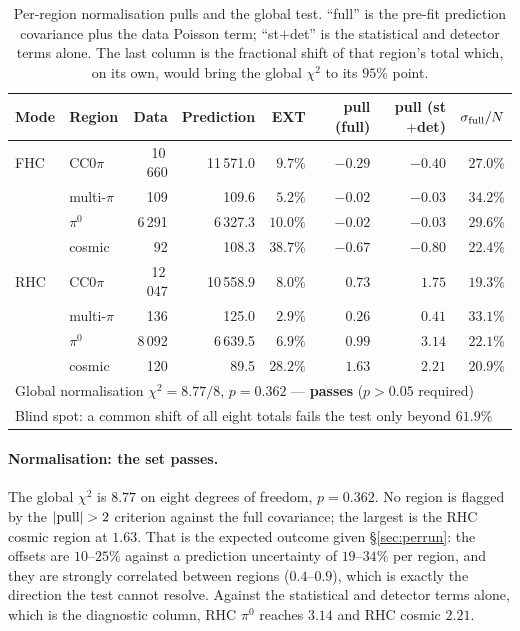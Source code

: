 \documentclass[11pt,a4paper]{article}
\begin{document}
\begin{table}[H]
  \centering
  \caption{Per-region normalisation pulls and the global test. ``full'' is the pre-fit
    prediction covariance plus the data Poisson term; ``st$+$det'' is the statistical and
    detector terms alone. The last column is the fractional shift of that region's total
    which, on its own, would bring the global $\chi^2$ to its $95\%$ point.}
  \label{tab:pulls}
  \small
  \begin{tabular}{llrrrrrr}
    \toprule
    Mode & Region & Data & Prediction & EXT & pull (full) & pull (st$+$det) & $\sigma_{\rm full}/N$ \\
    \midrule
    FHC & CC$0\pi$    & 10\,660 & 11\,571.0 & $9.7\%$  & $-0.29$ & $-0.40$ & $27.0\%$ \\
        & multi-$\pi$ &     109 &     109.6 & $5.2\%$  & $-0.02$ & $-0.03$ & $34.2\%$ \\
        & $\pi^0$     &  6\,291 &  6\,327.3 & $10.0\%$ & $-0.02$ & $-0.03$ & $29.6\%$ \\
        & cosmic      &      92 &     108.3 & $38.7\%$ & $-0.67$ & $-0.80$ & $22.4\%$ \\
    \midrule
    RHC & CC$0\pi$    & 12\,047 & 10\,558.9 & $8.0\%$  & $ 0.73$ & $ 1.75$ & $19.3\%$ \\
        & multi-$\pi$ &     136 &     125.0 & $2.9\%$  & $ 0.26$ & $ 0.41$ & $33.1\%$ \\
        & $\pi^0$     &  8\,092 &  6\,639.5 & $6.9\%$  & $ 0.99$ & $ 3.14$ & $22.1\%$ \\
        & cosmic      &     120 &      89.5 & $28.2\%$ & $ 1.63$ & $ 2.21$ & $20.9\%$ \\
    \midrule
    \multicolumn{8}{l}{Global normalisation $\chi^2 = 8.77/8$, $p=0.362$ --- \textbf{passes} ($p>0.05$ required)} \\
    \multicolumn{8}{l}{Blind spot: a common shift of all eight totals fails the test only beyond $61.9\%$} \\
    \bottomrule
  \end{tabular}
\end{table}

\paragraph{Normalisation: the set passes.} The global $\chi^2$ is $8.77$ on eight degrees
of freedom, $p=0.362$. No region is flagged by the $|{\rm pull}|>2$ criterion against the
full covariance; the largest is the RHC cosmic region at $1.63$. That is the expected
outcome given \S\ref{sec:perrun}: the offsets are $10$--$25\%$ against a prediction
uncertainty of $19$--$34\%$ per region, and they are strongly correlated between regions
($0.4$--$0.9$), which is exactly the direction the test cannot resolve. Against the
statistical and detector terms alone, which is the diagnostic column, RHC $\pi^0$ reaches
$3.14$ and RHC cosmic $2.21$.
\end{document}
